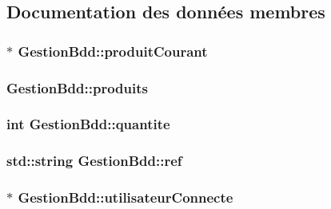 \subsection{Documentation des données membres}
\hypertarget{class_gestion_bdd_a892f50933d1226a389b561276bd0ca93}{
\subsubsection[{produit\-Courant}]{$\ast$ Gestion\-Bdd\-::produit\-Courant\hspace{0.3cm}{\ttfamily [protected]}}}\label{class_gestion_bdd_a892f50933d1226a389b561276bd0ca93}
\hypertarget{class_gestion_bdd_a3d8399948251d113edf841e5122c51b8}{
\subsubsection[{produits}]{ Gestion\-Bdd\-::produits\hspace{0.3cm}{\ttfamily [protected]}}}\label{class_gestion_bdd_a3d8399948251d113edf841e5122c51b8}
\hypertarget{class_gestion_bdd_aea2dfb9c9690c8aef62feb9936426588}{
\subsubsection[{quantite}]{\setlength{\rightskip}{0pt plus 5cm}int Gestion\-Bdd\-::quantite\hspace{0.3cm}{\ttfamily [protected]}}}\label{class_gestion_bdd_aea2dfb9c9690c8aef62feb9936426588}
\hypertarget{class_gestion_bdd_ae9e26a2043f3e10fb773107809bfc007}{
\subsubsection[{ref}]{\setlength{\rightskip}{0pt plus 5cm}std\-::string Gestion\-Bdd\-::ref\hspace{0.3cm}{\ttfamily [protected]}}}\label{class_gestion_bdd_ae9e26a2043f3e10fb773107809bfc007}
\hypertarget{class_gestion_bdd_adb07bb1f3015855aef7bcfe0b278ebd7}{
\subsubsection[{utilisateur\-Connecte}]{$\ast$ Gestion\-Bdd\-::utilisateur\-Connecte\hspace{0.3cm}{\ttfamily [protected]}}}\label{class_gestion_bdd_adb07bb1f3015855aef7bcfe0b278ebd7}

